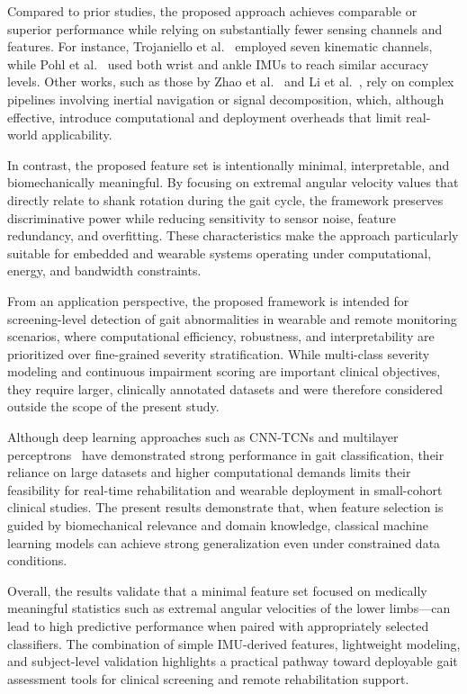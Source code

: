 Compared to prior studies, the proposed approach achieves comparable or superior performance while relying on substantially fewer sensing channels and features. 
For instance, Trojaniello et al.~\cite{ref30} employed seven kinematic channels, while Pohl et al.~\cite{ref31} used both wrist and ankle IMUs to reach similar 
accuracy levels. Other works, such as those by Zhao et al.~\cite{ref28} and Li et al.~\cite{ref32}, rely on complex pipelines involving inertial navigation or 
signal decomposition, which, although effective, introduce computational and deployment overheads that limit real-world applicability.

In contrast, the proposed feature set is intentionally minimal, interpretable, and biomechanically meaningful. By focusing on extremal angular velocity values 
that directly relate to shank rotation during the gait cycle, the framework preserves discriminative power while reducing sensitivity to sensor noise, feature 
redundancy, and overfitting. These characteristics make the approach particularly suitable for embedded and wearable systems operating under computational, 
energy, and bandwidth constraints.

From an application perspective, the proposed framework is intended for screening-level detection of gait abnormalities in wearable and remote monitoring scenarios, 
where computational efficiency, robustness, and interpretability are prioritized over fine-grained severity stratification. While multi-class severity modeling 
and continuous impairment scoring are important clinical objectives, they require larger, clinically annotated datasets and were therefore considered outside the 
scope of the present study.


Although deep learning approaches such as CNN-TCNs and multilayer perceptrons~\cite{ref33,ref34} have demonstrated strong performance in gait classification, 
their reliance on large datasets and higher computational demands limits their feasibility for real-time rehabilitation and wearable deployment in small-cohort 
clinical studies. The present results demonstrate that, when feature selection is guided by biomechanical relevance and domain knowledge, classical machine 
learning models can achieve strong generalization even under constrained data conditions.

Overall, the results validate that a minimal feature set focused on medically meaningful statistics such as extremal angular velocities of the lower limbs—can 
lead to high predictive performance when paired with appropriately selected classifiers. The combination of simple IMU-derived features, lightweight modeling, 
and subject-level validation highlights a practical pathway toward deployable gait assessment tools for clinical screening and remote rehabilitation support.
